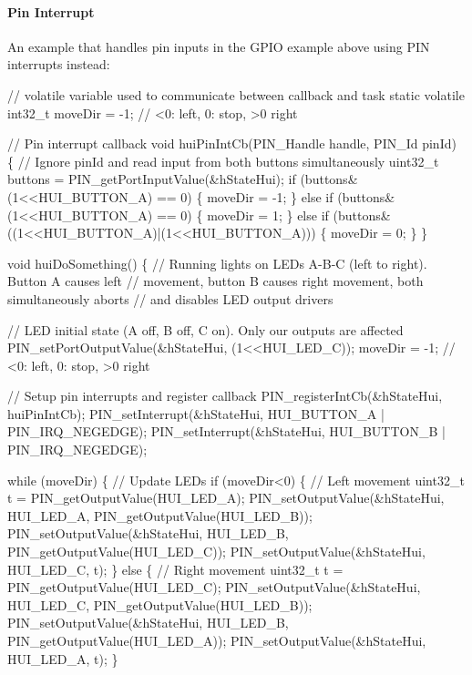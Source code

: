 \paragraph*{Pin Interrupt}

An example that handles pin inputs in the G\+P\+I\+O example above using P\+I\+N interrupts instead\+: 
\begin{DoxyCode}
\textcolor{comment}{// volatile variable used to communicate between callback and task}
\textcolor{keyword}{static} \textcolor{keyword}{volatile} int32\_t moveDir = -1;    \textcolor{comment}{// <0: left, 0: stop, >0 right}

\textcolor{comment}{// Pin interrupt callback}
\textcolor{keywordtype}{void} huiPinIntCb(PIN_Handle handle, PIN_Id pinId) \{
    \textcolor{comment}{// Ignore pinId and read input from both buttons simultaneously}
    uint32\_t buttons = PIN_getPortInputValue(&hStateHui);
    \textcolor{keywordflow}{if} (buttons&(1<<HUI\_BUTTON\_A) == 0) \{
        moveDir = -1;
    \} \textcolor{keywordflow}{else} \textcolor{keywordflow}{if} (buttons&(1<<HUI\_BUTTON\_A) == 0) \{
         moveDir = 1;
    \} \textcolor{keywordflow}{else} \textcolor{keywordflow}{if} (buttons&((1<<HUI\_BUTTON\_A)|(1<<HUI\_BUTTON\_A))) \{
        moveDir = 0;
    \}
\}

\textcolor{keywordtype}{void} huiDoSomething() \{
    \textcolor{comment}{// Running lights on LEDs A-B-C (left to right). Button A causes left}
    \textcolor{comment}{// movement, button B causes right movement, both simultaneously aborts}
    \textcolor{comment}{// and disables LED output drivers}

    \textcolor{comment}{// LED initial state (A off, B off, C on). Only our outputs are affected}
    PIN_setPortOutputValue(&hStateHui, (1<<HUI\_LED\_C));
    moveDir = -1;    \textcolor{comment}{// <0: left, 0: stop, >0 right}

    \textcolor{comment}{// Setup pin interrupts and register callback}
    PIN_registerIntCb(&hStateHui, huiPinIntCb);
    PIN_setInterrupt(&hStateHui, HUI\_BUTTON\_A | PIN_IRQ_NEGEDGE);
    PIN_setInterrupt(&hStateHui, HUI\_BUTTON\_B | PIN_IRQ_NEGEDGE);

    \textcolor{keywordflow}{while} (moveDir) \{
        \textcolor{comment}{// Update LEDs}
        \textcolor{keywordflow}{if} (moveDir<0) \{
            \textcolor{comment}{// Left movement}
            uint32\_t t = PIN_getOutputValue(HUI\_LED\_A);
            PIN_setOutputValue(&hStateHui, HUI\_LED\_A, PIN_getOutputValue(HUI\_LED\_B));
            PIN_setOutputValue(&hStateHui, HUI\_LED\_B, PIN_getOutputValue(HUI\_LED\_C));
            PIN_setOutputValue(&hStateHui, HUI\_LED\_C, t);
        \} \textcolor{keywordflow}{else} \{
            \textcolor{comment}{// Right movement}
            uint32\_t t = PIN_getOutputValue(HUI\_LED\_C);
            PIN_setOutputValue(&hStateHui, HUI\_LED\_C, PIN_getOutputValue(HUI\_LED\_B));
            PIN_setOutputValue(&hStateHui, HUI\_LED\_B, PIN_getOutputValue(HUI\_LED\_A));
            PIN_setOutputValue(&hStateHui, HUI\_LED\_A, t);
        \}


\end{DoxyCode}
